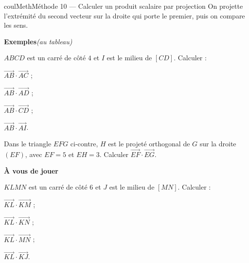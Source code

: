 \documentclass[11pt,a4paper]{article}
\makeatletter
\newcommand{\vect}[1]{\overrightarrow{#1}}
\newcommand{\pt}[3]{\path (#1) node[croix]{} node[#2,font=\small,inner sep=2.5pt]{$#3$};}
\newcounter{lycee@signet}
\newcommand{\signet}[3][]{\stepcounter{lycee@signet}%
  \edef\lycee@dest{\if\relax\detokenize{#1}\relax
    signet.\arabic{lycee@signet}\else#1\fi}%
  \hypertarget{\lycee@dest}{}\bookmark[level=#2,dest=\lycee@dest]{#3}}
\newcounter{methode}
\newenvironment{methodebox}[1][Méthode]{\stepcounter{methode}%
  \begin{boitecours}[phantom={\signet[methode-\arabic{methode}]{2}{#1}}]{coulMeth}{#1}}%
  {\end{boitecours}}
\newcommand{\etape}[1]{\par\smallskip\textbf{\color{coulMeth}#1}\par\nobreak\smallskip}
\newcommand{\autableau}{\hfill{\footnotesize\itshape\color{black!45}(au tableau)}}
\newcommand{\etapeexemples}{%
    \par\smallskip\textbf{\color{coulMeth}Exemples}\autableau\par\nobreak\smallskip}
\makeatother
\begin{document}
\begin{methodebox}[Méthode 10 --- Calculer un produit scalaire par projection]
On projette l'extrémité du second vecteur sur la droite qui porte le premier, puis on
compare les sens.
\etapeexemples
\begin{minipage}[t]{0.62\linewidth}\raggedright
$ABCD$ est un carré de côté $4$ et $I$ est le milieu de $[CD]$. Calculer :
\begin{questions}[label=\alph*)]
  \item $\vect{AB}\cdot\vect{AC}$ ;
  \item $\vect{AB}\cdot\vect{AD}$ ;
  \item $\vect{AB}\cdot\vect{CD}$ ;
  \item $\vect{AB}\cdot\vect{AI}$.
\end{questions}
\end{minipage}\hfill
\begin{minipage}[t]{0.34\linewidth}
\vspace{0pt}\centering
{}
\end{minipage}

\smallskip
\begin{minipage}[t]{0.62\linewidth}\raggedright
\begin{questions}[label=\alph*),start=5]
  \item Dans le triangle $EFG$ ci-contre, $H$ est le projeté orthogonal de $G$ sur la
        droite $(EF)$, avec $EF=5$ et $EH=3$. Calculer $\vect{EF}\cdot\vect{EG}$.
\end{questions}
\end{minipage}\hfill
\begin{minipage}[t]{0.34\linewidth}
\vspace{0pt}\centering
{}
\end{minipage}

\etape{À vous de jouer}
\begin{minipage}[t]{0.62\linewidth}\raggedright
$KLMN$ est un carré de côté $6$ et $J$ est le milieu de $[MN]$. Calculer :
\begin{questions}[label=\alph*)]
  \item $\vect{KL}\cdot\vect{KM}$ ;
  \item $\vect{KL}\cdot\vect{KN}$ ;
  \item $\vect{KL}\cdot\vect{MN}$ ;
  \item $\vect{KL}\cdot\vect{KJ}$.
\end{questions}
\end{minipage}\hfill
\begin{minipage}[t]{0.34\linewidth}
\vspace{0pt}\centering
{}
\end{minipage}


\end{methodebox}
\end{document}
